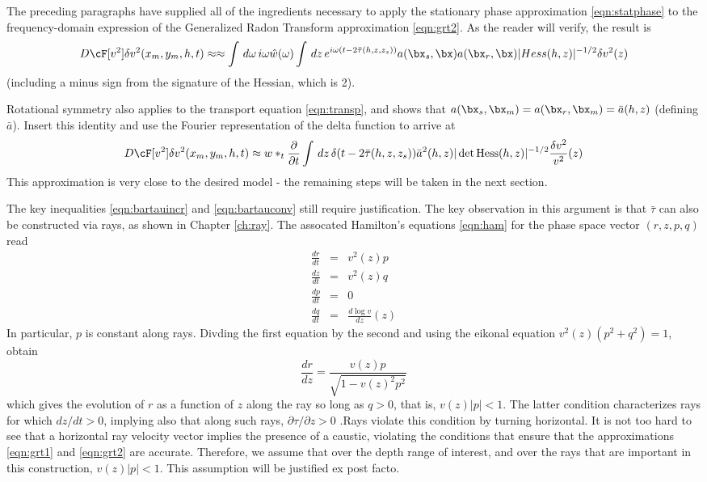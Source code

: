 The preceding paragraphs have supplied all of the ingredients necessary to apply the stationary phase approximation \ref{eqn:statphase} to the frequency-domain expression of the Generalized Radon Transform approximation \ref{eqn:grt2}. As the reader will verify, the result is 
\begin{equation}
\label{eqn:grt2sp}
D\cF[v^2]\delta v^2(x_m,y_m,h,t) \approx 
\approx \int\,d\omega\,i\omega \hat{w}(\omega)\int\,dz\,e^{i\omega(t-2\bar{\tau}(h,z,z_s))} a(\bx_s,\bx)a(\bx_r,\bx) |Hess(h,z)|^{-1/2}\delta v^2(z)
\end{equation}
(including a minus sign from the signature of the Hessian, which is 2).

Rotational symmetry also applies to the transport equation \ref{eqn:transp}, and shows that $a(\bx_s,\bx_m) = a(\bx_r,\bx_m)=\bar{a}(h,z)$ (defining $\bar{a}$). Insert this identity and use the Fourier representation of the delta function to arrive at 
\begin{equation}
\label{eqn:convz}
D\cF[v^2]\delta v^2(x_m,y_m,h,t) \approx w *_t \frac{\partial}{\partial t}\int\,dz\,
\delta(t-2\bar{\tau}(h,z,z_s)) \bar{a}^2(h,z)|\det {\rm Hess}(h,z)|^{-1/2}\frac{\delta v^2}{v^2}(z)
\end{equation}
This approximation is very close to the desired model - the remaining steps will be taken in the next section.

The key inequalities \ref{eqn:bartauincr} and \ref{eqn:bartauconv} still require justification. The key observation in this argument is that $\bar{\tau}$ can also be constructed via rays, as shown in Chapter \ref{ch:ray}. The assocated Hamilton's equations \ref{eqn:ham} for the phase space vector $(r,z,p,q)$ read
\begin{eqnarray}
\label{eqn:hamr}
\frac{dr}{dt} & = & v^2(z)p\\
\frac{dz}{dt} & = & v^2(z)q\\
\frac{dp}{dt} & = & 0\\
\frac{dq}{dt} & = & \frac{d \log v}{dz}(z)
\end{eqnarray}
In particular, $p$ is constant along rays. Divding the first equation by the second and using the eikonal equation $v^2(z) (p^2 + q^2) = 1$, obtain 
\begin{equation}
\label{eqn:drdz}
\frac{dr}{dz} = \frac{v(z)p}{\sqrt{1-v(z)^2 p^2}}
\end{equation} 
which gives the evolution of $r$ as a function of $z$ along the ray so long as $q > 0$, that is, $v(z)|p|<1$. The latter condition characterizes rays for which $dz/dt > 0$, implying also that along such rays, $\partial\tau/\partial z > 0$ .Rays violate this condition by turning horizontal. It is not too hard to see that a horizontal ray velocity vector implies the presence of a caustic, violating the conditions that ensure that the approximations \ref{eqn:grt1} and \ref{eqn:grt2} are accurate. Therefore, we assume that over the depth range of interest, and over the rays that are important in this construction, $v(z)|p| < 1$. This assumption will be justified ex post facto.

